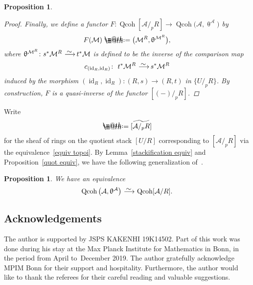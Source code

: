 \documentclass[pdftex]{sigma}%
\makeatletter
\newtheorem{prop}[dfn]{Proposition}
\newcommand*{\defeq}{\mathrel{\rlap{%
 \raisebox{0.3ex}{$\m@th\cdot$}}%
 \raisebox{-0.3ex}{$\m@th\cdot$}}%
 =}
\numberwithin{equation}{section}
\newcommand{\Qcoh}{\operatorname{Qcoh}}
\newcommand{\id}{\operatorname{id}}
\newcommand{\cA}{\mathcal{A}}
\newcommand{\cM}{\mathcal{M}}
\newcommand{\simto}{\,\,\,\,\raisebox{4pt}{$\sim$}{\kern -1.1em \longrightarrow}\,}
\makeatother
\begin{document}
\begin{prop}
\begin{proof}
Finally, we define a functor $F\colon \Qcoh[\cA/_pR]\to \Qcoh\big(\cA,\uptheta^{\cA}\big)$ by
\begin{gather*}
F(\cM)\defeq\big(\cM^R, \uptheta^{\cM^R}\big),
\end{gather*}
where $\uptheta^{\cM^R}\colon s^*\cM^R\simto t^*\cM$ is defined to be the inverse of the comparison map
\begin{gather*}
c_{(\id_R,\id_R)}\colon\ t^*\cM^R\simto s^*\cM^R
\end{gather*}
induced by the morphism $(\id_R,\id_R)\colon (R,s)\to (R,t)$ in $\{U/_pR\}$. By construction, $F$ is a quasi-inverse of the functor $[(-)/_pR]$.
\end{proof}
\end{prop}

Write
\begin{gather*}
[\cA/R]\defeq\widetilde{[\cA/_pR]}
\end{gather*}
for the sheaf of rings on the quotient stack $[U/R]$ corresponding to $[\cA/_pR]$ via the equivalence~\eqref{equiv topoi}. By Lemma~\ref{stackification equiv} and Proposition~\ref{quot equiv}, we have the following
 generalization of~\cite[Proposition~13.1; 06WT]{stacks}.

\begin{prop}\label{main app}
We have an equivalence
\begin{gather*}
\Qcoh\big(\cA,\uptheta^{\cA}\big)\simto \Qcoh[\cA/R].
\end{gather*}
\end{prop}

\subsection*{Acknowledgements}

The author is supported by JSPS KAKENHI 19K14502. Part of this work was done during his stay at the Max Planck Institute for Mathematics in Bonn, in the period from April to~Decem\-ber 2019. The author gratefully acknowledge MPIM Bonn for their support and hospitality. Furthermore, the author would like to thank the referees for their careful reading and valuable suggestions.

\end{document}
